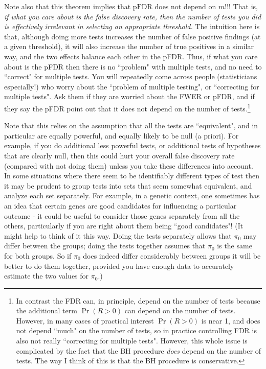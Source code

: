 \documentclass[times,11pt]{article}
\def\pFDR{\text{pFDR}}
\begin{document}
Note also that this theorem implies that $\pFDR$ does not depend on $m$!!! That is, {\it if what you care about is the false discovery rate, then the number of tests you did is effectively irrelevant in selecting an appropriate threshold.} The intuition here is that, although doing more tests increases the number of false positive findings (at a given threshold), it will also increase the number of true positives in a similar way, and the two effects balance each other in the pFDR. Thus, if what you care about is the pFDR then there is no ``problem" with multiple tests, and no need to ``correct" for multiple tests. You will repeatedly come across people (statisticians especially!) who worry about the ``problem of multiple testing", or ``correcting for multiple tests". Ask them if they are worried about the FWER or pFDR, and if they say the pFDR point out that it does not depend on the number of tests.\footnote{In contrast the FDR can, in principle, depend on the number of tests because the additional term $\Pr(R>0)$ can depend on the number of tests. However, in many cases of practical interest $\Pr(R>0)$ is near 1, and does not depend ``much" on the number of tests, so in practice controlling FDR is also not really ``correcting for multiple tests". However, this whole issue is complicated by the fact that the BH procedure {\it does} depend on the number of tests. The way I think of this is that the BH procedure is conservative.}

Note that this relies on the assumption that all the tests are ``equivalent", and in particular are equally powerful, and equally likely to be null (a priori). For example, if you do additional less powerful tests, or additional tests of hypotheses that are clearly null, then this could hurt your overall false discovery rate (compared with not doing them) unless you take these differences into account. In some situations where there seem to be identifiably different types of test then it may be prudent to group tests into sets that seem somewhat equivalent, and analyze each set separately. For example, in a genetic context, one sometimes has an idea that certain
genes are good candidates for influencing a particular outcome - it could be useful to consider
those genes separately from all the others,
particularly if you are right about them being ``good candidates"!  (It might help to think of it this way. Doing the tests separately allows that $\pi_0$ may differ between the groups; doing the tests together assumes that $\pi_0$ is the same for both groups. So if $\pi_0$ does indeed
differ considerably between groups it will be better
to do them together, provided you have enough data to accurately estimate the two values for $\pi_0$.)
\end{document}
